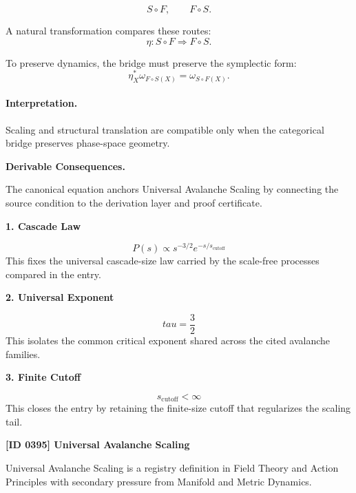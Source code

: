 \begin{equation}
S\circ F,
\qquad
F\circ S.
\end{equation}

A natural transformation compares these routes:
\begin{equation}
\eta:S\circ F\Rightarrow F\circ S.
\end{equation}

To preserve dynamics, the bridge must preserve the symplectic form:
\begin{equation}
\boxed{
\eta_X^{*}\omega_{F\circ S(X)}
=
\omega_{S\circ F(X)}.
}
\end{equation}

\paragraph{Interpretation.}
Scaling and structural translation are compatible only when the categorical bridge preserves phase-space geometry.

\par\vspace{0.35em}
\noindent\textbf{Derivable Consequences.}\quad
\begingroup
\footnotesize
\raggedright
The canonical equation anchors Universal Avalanche Scaling by connecting the source condition to the derivation layer and proof certificate.
\par\endgroup

\noindent\textbf{1. Cascade Law}\par
\[
P(s)\propto s^{-3/2}e^{-s/s_{\mathrm{cutoff}}}
\]
\noindent This fixes the universal cascade-size law carried by the scale-free processes compared in the entry.\par
\noindent\textbf{2. Universal Exponent}\par
\[
tau=\frac{3}{2}
\]
\noindent This isolates the common critical exponent shared across the cited avalanche families.\par
\noindent\textbf{3. Finite Cutoff}\par
\[
s_{\mathrm{cutoff}}<\infty
\]
\noindent This closes the entry by retaining the finite-size cutoff that regularizes the scaling tail.\par

\clearpage
\noindent\textbf{[ID 0395] Universal Avalanche Scaling}\par
\vspace{0.35em}
\begingroup\small
{}
Universal Avalanche Scaling is a registry definition in Field Theory and Action Principles with secondary pressure from Manifold and Metric Dynamics.


